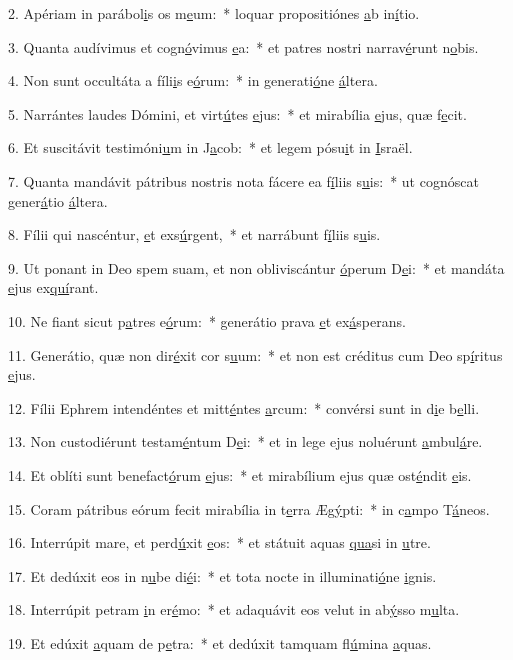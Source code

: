 2. Apériam in parábol\uline{i}s os m\uline{e}um:~* loquar propositiónes \uline{a}b in\uline{í}tio.\par 
3. Quanta audívimus et cogn\uline{ó}vimus \uline{e}a:~* et patres nostri narrav\uline{é}runt n\uline{o}bis.\par 
4. Non sunt occultáta a fíli\uline{i}s e\uline{ó}rum:~* in generati\uline{ó}ne \uline{á}ltera.\par 
5. Narrántes laudes Dómini, et virt\uline{ú}tes \uline{e}jus:~* et mirabília \uline{e}jus, quæ f\uline{e}cit.\par 
6. Et suscitávit testimóni\uline{u}m in J\uline{a}cob:~* et legem pósu\uline{i}t in \uline{I}sraël.\par 
7. Quanta mandávit pátribus nostris nota fácere ea f\uline{í}liis s\uline{u}is:~* ut cognóscat gener\uline{á}tio \uline{á}ltera.\par 
8. Fílii qui nascéntur, \uline{e}t exs\uline{ú}rgent,~* et narrábunt f\uline{í}liis s\uline{u}is.\par 
9. Ut ponant in Deo spem suam, et non obliviscántur \uline{ó}perum D\uline{e}i:~* et mandáta \uline{e}jus ex\uline{quí}rant.\par 
10. Ne fiant sicut p\uline{a}tres e\uline{ó}rum:~* generátio prava \uline{e}t ex\uline{á}sperans.\par 
11. Generátio, quæ non dir\uline{é}xit cor s\uline{u}um:~* et non est créditus cum Deo sp\uline{í}ritus \uline{e}jus.\par 
12. Fílii Ephrem intendéntes et mitt\uline{é}ntes \uline{a}rcum:~* convérsi sunt in d\uline{i}e b\uline{e}lli.\par 
13. Non custodiérunt testam\uline{é}ntum D\uline{e}i:~* et in lege ejus noluérunt \uline{a}mbul\uline{á}re.\par 
14. Et oblíti sunt benefact\uline{ó}rum \uline{e}jus:~* et mirabílium ejus quæ ost\uline{é}ndit \uline{e}is.\par 
15. Coram pátribus eórum fecit mirabília in t\uline{e}rra Æg\uline{ý}pti:~* in c\uline{a}mpo T\uline{á}neos.\par 
16. Interrúpit mare, et perd\uline{ú}xit \uline{e}os:~* et státuit aquas \uline{qua}si in \uline{u}tre.\par 
17. Et dedúxit eos in n\uline{u}be di\uline{é}i:~* et tota nocte in illuminati\uline{ó}ne \uline{i}gnis.\par 
18. Interrúpit petram \uline{i}n er\uline{é}mo:~* et adaquávit eos velut in ab\uline{ý}sso m\uline{u}lta.\par 
19. Et edúxit \uline{a}quam de p\uline{e}tra:~* et dedúxit tamquam fl\uline{ú}mina \uline{a}quas.\par 
